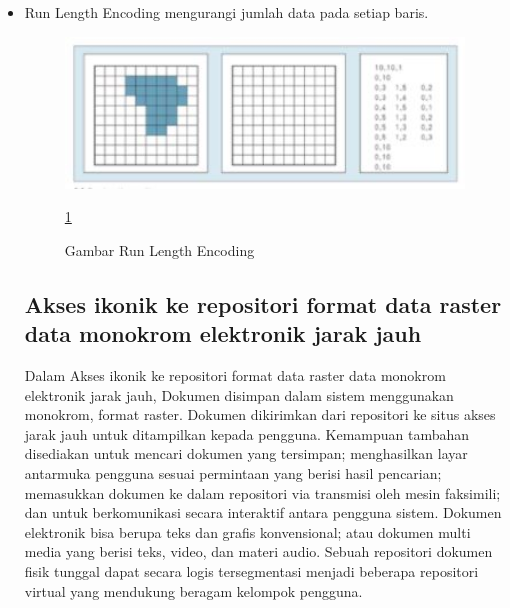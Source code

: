 	\begin{itemize}
		\item  Run Length Encoding
				mengurangi jumlah data pada setiap baris.
				\begin{figure} [ht]
					\centerline{\includegraphics[width=1\textwidth]{figures/runlengthencoding.JPG}}
					\caption{Gambar Run Length Encoding}
					\label{runlengthencoding}
					\ref{runlengthencoding}
				\end{figure}
				
\subsection{Akses ikonik ke repositori format data raster data monokrom elektronik jarak jauh}
Dalam Akses ikonik ke repositori format data raster data monokrom elektronik jarak jauh, 
Dokumen disimpan dalam sistem menggunakan monokrom, format raster. 
Dokumen dikirimkan dari repositori ke situs akses jarak jauh untuk ditampilkan kepada pengguna. 
Kemampuan tambahan disediakan untuk mencari dokumen yang tersimpan; 
menghasilkan layar antarmuka pengguna sesuai permintaan yang berisi hasil pencarian; 
memasukkan dokumen ke dalam repositori via transmisi oleh mesin faksimili; 
dan untuk berkomunikasi secara interaktif antara pengguna sistem. 
Dokumen elektronik bisa berupa teks dan grafis konvensional; 
atau dokumen multi media yang berisi teks, video, dan materi audio. 
Sebuah repositori dokumen fisik tunggal dapat secara logis tersegmentasi menjadi
beberapa repositori virtual yang mendukung beragam kelompok pengguna.


\end{itemize}
